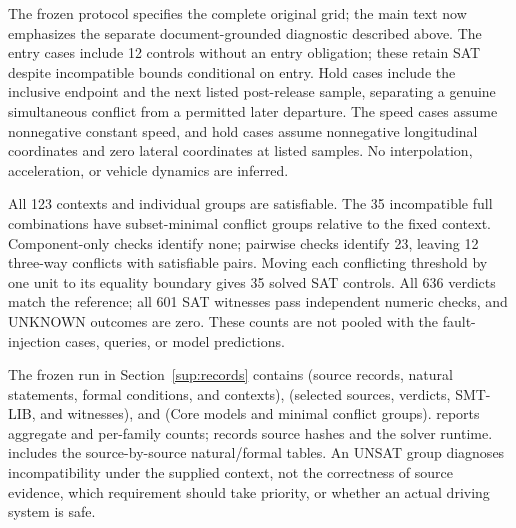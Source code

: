 \documentclass[10pt]{article}
\begin{document}
The frozen protocol specifies the complete original grid; the main text now
emphasizes the separate document-grounded diagnostic described above. The entry cases include 12 controls without an entry obligation;
these retain SAT despite incompatible bounds conditional on entry. Hold
cases include the inclusive endpoint and the next listed post-release sample,
separating a genuine simultaneous conflict from a permitted later departure.
The speed cases assume nonnegative constant speed, and hold cases assume
nonnegative longitudinal coordinates and zero lateral coordinates at listed
samples. No interpolation, acceleration, or vehicle dynamics are inferred.

All 123 contexts and individual groups are satisfiable. The 35 incompatible
full combinations have subset-minimal conflict groups relative to the fixed
context. Component-only checks identify none; pairwise checks identify 23,
leaving 12 three-way conflicts with satisfiable pairs. Moving each conflicting
threshold by one unit to its equality boundary gives 35 solved SAT controls.
All 636 verdicts match the reference; all 601 SAT witnesses pass independent
numeric checks, and UNKNOWN outcomes are zero. These counts are not pooled
with the fault-injection cases, queries, or model predictions.

\begingroup\raggedright
The frozen run in Section~\ref{sup:records} contains
 (source records, natural statements, formal conditions, and
contexts),  (selected sources, verdicts, SMT-LIB, and
witnesses), and  (Core models and minimal conflict
groups).  reports aggregate and per-family counts;
 records source hashes and the solver runtime.
 includes the source-by-source natural/formal tables.
An UNSAT group diagnoses incompatibility under the supplied context, not the
correctness of source evidence, which requirement should take priority, or
whether an actual driving system is safe.
\par\endgroup
\end{document}
